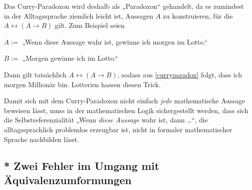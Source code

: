 \begin{bem}
    Das Curry-Paradoxon wird deshalb als „Paradoxon“ gehandelt, da es zumindest in der Alltagssprache ziemlich leicht ist, Aussagen $A$ zu konstruieren, für die $A\leftrightarrow (A\to B)$ gilt. Zum Beispiel seien
    \begin{labeling}[labelindent=1.5em]
        \item[$A:=$] „Wenn diese Aussage wahr ist, gewinne ich morgen im Lotto.“
        \item[$B:=$] „Morgen gewinne ich im Lotto.“
    \end{labeling}
    Dann gilt tatsächlich $A\leftrightarrow (A\to B)$, sodass aus \cref{curryparadox} folgt, dass ich morgen Millionär bin. Lotterien hassen diesen Trick.
    
    Damit sich mit dem Curry-Paradoxon nicht einfach \emph{jede} mathematische Aussage beweisen lässt, muss in der mathematischen Logik sichergestellt werden, dass sich die Selbstreferenzialität „Wenn \emph{diese Aussage} wahr ist, dann \dots“, die alltagssprachlich problemlos erzeugbar ist, nicht in formaler mathematischer Sprache nachbilden lässt.
\end{bem}





\subsection*{* Zwei Fehler im Umgang mit Äquivalenzumformungen}


